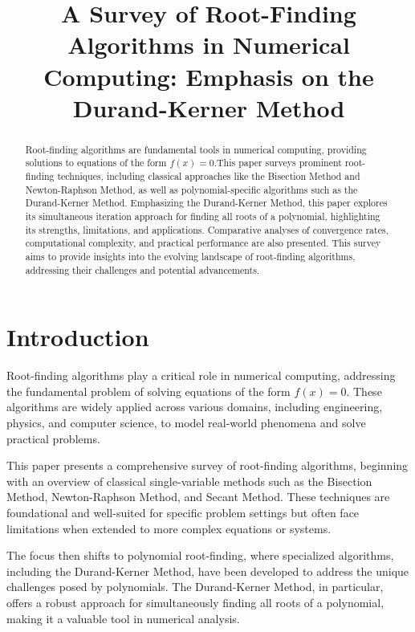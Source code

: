 \documentclass[10pt]{IEEEtran}
\begin{document}
\title{A Survey of Root-Finding Algorithms in Numerical Computing: Emphasis on the Durand-Kerner Method}

\author{
}

\maketitle

\begin{abstract}
Root-finding algorithms are fundamental tools in numerical computing, providing solutions to equations of the form $f(x) = 0$\cite{qureshiNewOptimalRootfinding2024}.This paper surveys prominent root-finding techniques, including classical approaches like the Bisection Method and Newton-Raphson Method, as well as polynomial-specific algorithms such as the Durand-Kerner Method. Emphasizing the Durand-Kerner Method, this paper explores its simultaneous iteration approach for finding all roots of a polynomial, highlighting its strengths, limitations, and applications. Comparative analyses of convergence rates, computational complexity, and practical performance are also presented. This survey aims to provide insights into the evolving landscape of root-finding algorithms, addressing their challenges and potential advancements.
\end{abstract}



\section{Introduction}
Root-finding algorithms play a critical role in numerical computing, addressing the fundamental problem of solving equations of the form $f(x) = 0$. These algorithms are widely applied across various domains, including engineering, physics, and computer science, to model real-world phenomena and solve practical problems. 

This paper presents a comprehensive survey of root-finding algorithms, beginning with an overview of classical single-variable methods such as the Bisection Method, Newton-Raphson Method, and Secant Method. These techniques are foundational and well-suited for specific problem settings but often face limitations when extended to more complex equations or systems. 

The focus then shifts to polynomial root-finding, where specialized algorithms, including the Durand-Kerner Method, have been developed to address the unique challenges posed by polynomials. The Durand-Kerner Method, in particular, offers a robust approach for simultaneously finding all roots of a polynomial, making it a valuable tool in numerical analysis. 
\end{document}
